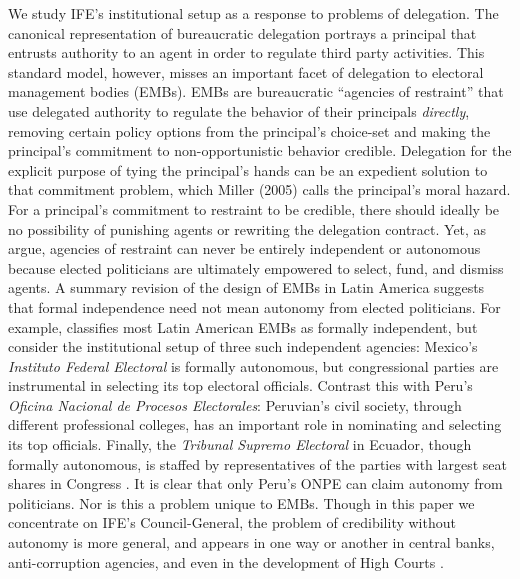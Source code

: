 \documentclass[12 pt]{article}
\begin{document}
We study IFE's institutional setup as a response to problems of delegation.  The canonical representation of bureaucratic delegation portrays a principal that entrusts authority to an agent in order to regulate third party activities.  This standard model, however, misses an important facet of delegation to electoral management bodies (EMBs).  EMBs are bureaucratic ``agencies of restraint'' \citep{Schedler1999} that use delegated authority to regulate the behavior of their principals \emph{directly}, removing certain policy options from the principal's choice-set and making the principal's commitment to non-opportunistic behavior credible.  Delegation for the explicit purpose of tying the principal's hands can be an expedient solution to that commitment problem, which Miller (2005) calls the principal's moral hazard.  For a principal's commitment to restraint to be credible, there should ideally be no possibility of punishing agents or rewriting the delegation contract.  Yet, as \citet{Moreno2003} argue, agencies of restraint can never be entirely independent or autonomous because elected politicians are ultimately empowered to select, fund, and dismiss agents.  A summary revision of the design of EMBs in Latin America suggests that formal independence need not mean autonomy from elected politicians.  For example, \citet{LopezPintor2000} classifies most Latin American EMBs as formally independent, but consider the institutional setup of three such independent agencies: Mexico's \emph{Instituto Federal Electoral} is formally autonomous, but congressional parties are instrumental in selecting its top electoral officials. Contrast this with Peru's \emph{Oficina Nacional de Procesos Electorales}: Peruvian's civil society, through different professional colleges, has an important role in nominating and selecting its top officials. Finally, the \emph{Tribunal Supremo Electoral} in Ecuador, though formally autonomous, is staffed by representatives of the parties with largest seat shares in Congress \citep{Mozaffar2002a, Jaramillo1993, LopezPintor2000, Molina1999, Payne2002, Hartlyn2006, Rosas2007, Schedler2000a}.  It is clear that only Peru's ONPE can claim autonomy from politicians.  Nor is this a problem unique to EMBs.  Though in this paper we concentrate on IFE's Council-General, the problem of credibility without autonomy is more general, and appears in one way or another in central banks, anti-corruption agencies, and even in the development of High Courts \citep{Schedler1999, Gibson1998, Gibson2003, Cukierman1992, Cukierman2002, Moreno2003}.
\end{document}
